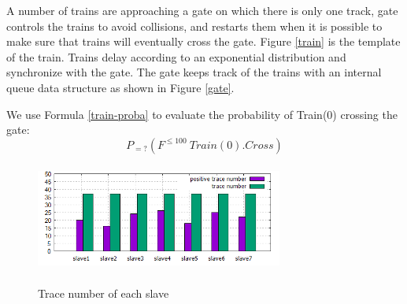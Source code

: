 A number of trains are approaching a gate on which there is only one track, gate controls the trains to avoid collisions, and restarts them when it is possible to make sure that trains will eventually cross the gate. Figure \ref{train} is the template of the train. Trains delay according to an exponential distribution and synchronize with the gate. The gate keeps track of the trains with an internal queue data structure as shown in Figure \ref{gate}.
\begin{figure}[htbp]
\end{figure}
We use Formula \ref{train-proba} to evaluate the probability of Train(0) crossing the gate:
\begin{equation}
P_{=?}(F^{\leq100}~Train(0).Cross)
\label{train-proba}
\end{equation}
\begin{figure}[htbp]
	\centering
	{\includegraphics[width=3.2in,height=1.4in]{fig/trace-slave.png}}
	\caption{Trace number of each slave}
   \label{trace-slave}
\end{figure}
